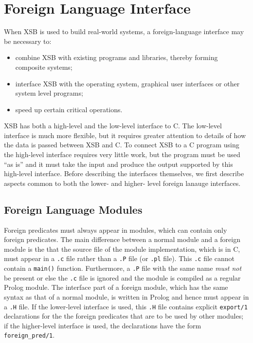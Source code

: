 \chapter{Foreign Language Interface}
\label{foreign}

When XSB is used to build real-world systems, a foreign-language
interface may be necessary to:
\begin{itemize}
\item combine XSB with existing programs and libraries, thereby
      forming composite systems;
\item interface XSB with the operating system, graphical user 
      interfaces or other system level programs;
\item speed up certain critical operations.
\end{itemize}

XSB has both a high-level and the low-level interface to C.  The
low-level interface is much more flexible, but it requires greater
attention to details of how the data is passed between XSB and C.  To
connect XSB to a C program using the high-level interface requires
very little work, but the program must be used ``as is'' and it must
take the input and produce the output supported by this high-level
interface.  Before describing the interfaces themselves, we first
describe aspects common to both the lower- and higher- level foreign
lanauge interfaces.

\section{Foreign Language Modules}

Foreign predicates must always appear in modules, which can contain
only foreign predicates.  The main difference between a normal module
and a foreign module is the that the source file of the module
implementation, which is in C, must appear in a {\tt *.c} file rather
than a {\tt *.P} file (or {\tt .pl} file).  This {\tt *.c} file cannot
contain a {\tt main()} function.  Furthermore, a {\tt *.P} file with
the same name {\em must not} be present or else the {\tt *.c} file is
ignored and the module is compiled as a regular Prolog module.  The
interface part of a foreign module, which has the same syntax as that
of a normal module, is written in Prolog and hence must appear in a
{\tt *.H} file.  If the lower-level interface is used, this {\tt *.H}
file contains explicit {\tt export/1} declarations for the the foreign
predicates that are to be used by other modules; if the higher-level
interface is used, the declarations have the form {\tt foreign\_pred/1}.

